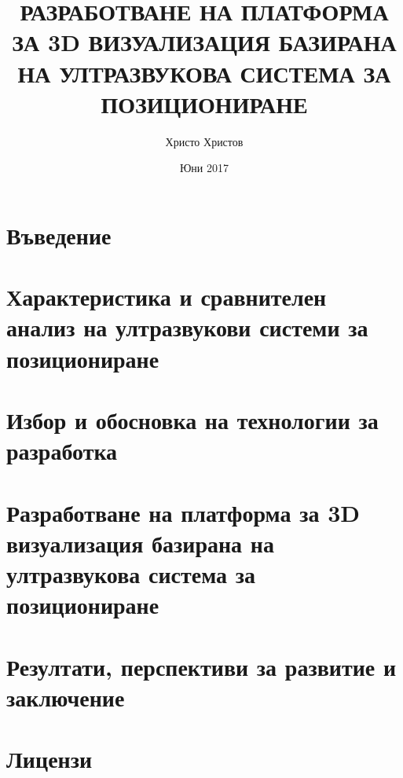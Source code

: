 \documentclass{article}
\title{РАЗРАБОТВАНЕ НА ПЛАТФОРМА ЗА 3D ВИЗУАЛИЗАЦИЯ БАЗИРАНА НА УЛТРАЗВУКОВА СИСТЕМА ЗА ПОЗИЦИОНИРАНЕ}
\author{Христо Христов}
\date{Юни 2017}
\begin{document}
\maketitle

\tableofcontents

\section{Въведение}



\section{Характеристика и сравнителен анализ на ултразвукови системи за позициониране}



\section{Избор и обосновка на технологии за разработка}


\section{Разработване на платформа за 3D визуализация базирана на ултразвукова система за позициониране}


\section{Резултати, перспективи за развитие и заключение}


\section{Лицензи}

\end{document}
